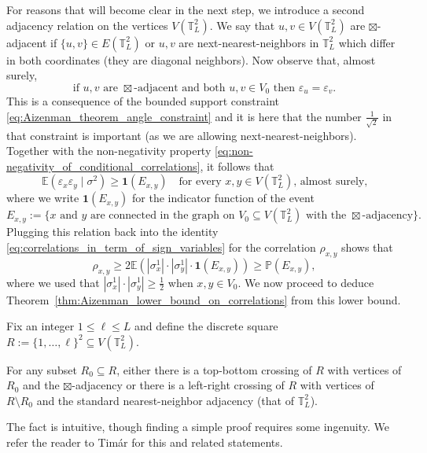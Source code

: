 \documentclass[12pt,reqno]{article}
\def\P{\mathbb{P}}
\def\E{\mathbb{E}}
\def\T{\mathbb{T}}
\def\one{\mathbf{1}}
\def\eps{\varepsilon}
\begin{document}
For reasons that will become clear in the next step, we introduce a second adjacency relation on the vertices $V(\T_L^2)$. We say that $u,v\in V(\T_L^2)$ are $\boxtimes$-adjacent if $\{u,v\}\in E(\T_L^2)$ or $u,v$ are next-nearest-neighbors in $\T_L^2$ which differ in both coordinates (they are diagonal neighbors). Now observe that, almost surely,
\begin{equation*}
\text{if $u,v$ are $\boxtimes$-adjacent and both $u,v\in V_0$ then $\eps_u = \eps_v$}.
\end{equation*}
This is a consequence of the bounded support constraint \eqref{eq:Aizenman_theorem_angle_constraint} and it is here that the number $\frac{1}{\sqrt{2}}$ in that constraint is important (as we are allowing next-nearest-neighbors). Together with the non-negativity property \eqref{eq:non-negativity_of_conditional_correlations}, it follows that
\begin{equation*}
  \E(\eps_x \eps_y\; |\; \sigma^2) \ge \one(E_{x,y})\quad\text{for every $x,y\in V(\T_L^2)$, almost surely,}
\end{equation*}
where we write $\one(E_{x,y})$ for the indicator function of the event
\begin{equation*}
  E_{x,y}:=\{\text{$x$ and $y$ are connected in the graph on $V_0\subseteq V(\T_L^2)$ with the $\boxtimes$-adjacency}\}.
\end{equation*}
Plugging this relation back into the identity \eqref{eq:correlations_in_term_of_sign_variables} for the correlation $\rho_{x,y}$ shows that
\begin{equation}\label{eq:rho_lower_bound_by_E_x_y}
  \rho_{x,y} \ge 2\E(|\sigma_x^1|\cdot |\sigma_y^1| \cdot \one(E_{x,y})) \ge \P(E_{x,y}),
\end{equation}
where we used that $|\sigma_x^1|\cdot |\sigma_y^1|\ge \frac{1}{2}$ when $x,y\in V_0$. We now proceed to deduce Theorem~\ref{thm:Aizenman_lower_bound_on_correlations} from this lower bound.

\medbreak
{}
Fix an integer $1\le \ell\le L$ and define the discrete square $R := \{1, \ldots, \ell\}^2 \subseteq V(\T_L^2)$.

\medbreak
{}
For any subset $R_0\subseteq R$, either there is a top-bottom crossing of $R$ with vertices of $R_0$ and the $\boxtimes$-adjacency or there is a left-right crossing of $R$ with vertices of $R\setminus R_0$ and the standard nearest-neighbor adjacency (that of $\T_L^2$).

\smallskip\noindent The fact is intuitive, though finding a simple proof
requires some ingenuity. We refer the reader to Tim\'ar \cite{Tim13}
for this and related statements.
\end{document}
